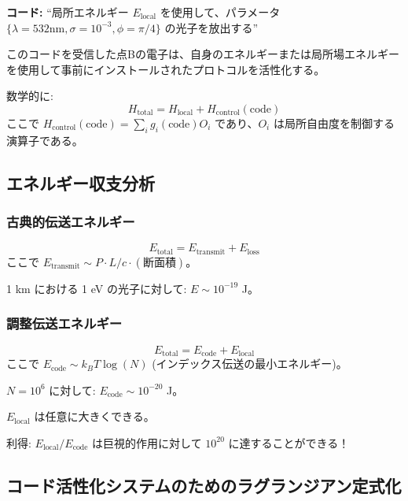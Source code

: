 \documentclass[11pt,a4paper]{article}
\begin{document}
	\textbf{コード:} ``局所エネルギー $E_{\text{local}}$ を使用して、パラメータ $\{\lambda=532\text{nm}, \sigma=10^{-3}, \phi=\pi/4\}$ の光子を放出する''
	
	このコードを受信した点Bの電子は、自身のエネルギーまたは局所場エネルギーを使用して事前にインストールされたプロトコルを活性化する。
	
	数学的に:
	\begin{equation}
		H_{\text{total}} = H_{\text{local}} + H_{\text{control}}(\text{code})
	\end{equation}
	ここで $H_{\text{control}}(\text{code}) = \sum_i g_i(\text{code}) O_i$ であり、$O_i$ は局所自由度を制御する演算子である。
	
	\subsection{エネルギー収支分析}
	
	\subsubsection{古典的伝送エネルギー}
	\begin{equation}
		E_{\text{total}} = E_{\text{transmit}} + E_{\text{loss}}
	\end{equation}
	ここで $E_{\text{transmit}} \sim P \cdot L/c \cdot (\text{断面積})$。
	
	1 km における 1 eV の光子に対して: $E \sim 10^{-19}$ J。
	
	\subsubsection{調整伝送エネルギー}
	\begin{equation}
		E_{\text{total}} = E_{\text{code}} + E_{\text{local}}
	\end{equation}
	ここで $E_{\text{code}} \sim k_B T \log(N)$ (インデックス伝送の最小エネルギー)。
	
	$N=10^6$ に対して: $E_{\text{code}} \sim 10^{-20}$ J。
	
	$E_{\text{local}}$ は任意に大きくできる。
	
	利得: $E_{\text{local}} / E_{\text{code}}$ は巨視的作用に対して $10^{20}$ に達することができる！
	
	\subsection{コード活性化システムのためのラグランジアン定式化}
	
\end{document}
